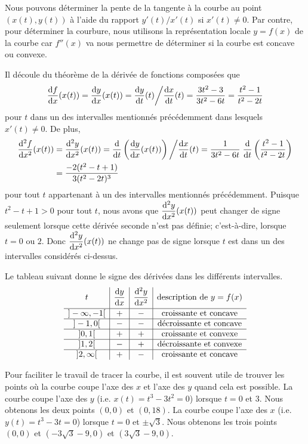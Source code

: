 {\begin{egg}[\theory]
Nous pouvons déterminer la pente de la tangente à la courbe au point
$(x(t),y(t))$ à l'aide du rapport $y'(t)/x'(t)$ si $x'(t) \neq 0$.
Par contre, pour déterminer la courbure, nous utilisons la
représentation locale $y=f(x)$ de la courbe car $f''(x)$ va nous
permettre de déterminer si la courbe est concave ou convexe.

Il découle du théorème de la dérivée de fonctions composées que
\[
\dydx{f}{x}(x(t)) = \dydx{y}{x}(x(t)) = \dydx{y}{t}(t) \bigg/ \dydx{x}{t}(t)
= \frac{3t^2-3}{3t^2-6t} = \frac{t^2-1}{t^2-2t}
\]
pour $t$ dans un des intervalles mentionnés précédemment dans lesquels
$x'(t)\neq 0$.  De plus,
\begin{align*}
\dydxn{f}{x}{2}(x(t)) &= \dydxn{y}{x}{2}(x(t)) =
\dfdx{\left( \dydx{y}{x}(x(t)) \right)}{t}\bigg/\dydx{x}{t}(t)
= \frac{1}{3t^2-6t}\;
\dfdx{\left( \frac{t^2-1}{t^2-2t} \right)}{t} \\
&= \frac{-2(t^2-t+1)}{3(t^2-2t)^3}
\end{align*}
pour tout $t$ appartenant à un des intervalles mentionnés
précédemment.  Puisque $t^2-t+1 >0$ pour tout $t$, nous avons que
$\DS \dydxn{y}{x}{2}(x(t))$ peut changer de signe seulement
lorsque cette dérivée seconde n'est pas définie; c'est-à-dire, lorsque
$t=0$ ou $2$.  Donc $\DS \dydxn{y}{x}{2}(x(t))$ ne change
pas de signe lorsque $t$ est dans un des intervalles considérés ci-dessus.

Le tableau suivant donne le signe des dérivées dans les
différents intervalles.
\[
\begin{array}{c|c|c|c}
t & \DS \dydx{y}{x} & \DS \dydxn{y}{x}{2} &
\text{description de } y=f(x) \\[0.7em]
\hline
]-\infty,-1[ & + & - & \text{croissante et concave} \\
\hline
]-1,0[ & - & - & \text{décroissante et concave} \\
\hline
]0,1[ & + & + & \text{croissante et convexe} \\
\hline
]1,2[ & - & + & \text{décroissante et convexe} \\
\hline
]2,\infty[ & + & - & \text{croissante et concave}
\end{array}
\]

Pour faciliter le travail de tracer la courbe, il est souvent utile de
trouver les points où la courbe coupe l'axe des $x$ et l'axe des $y$
quand cela est possible.  La courbe coupe l'axe des $y$
(i.e. $x(t)=t^3-3t^2=0$) lorsque $t=0$ et $3$.  Nous obtenons les deux
points $(0,0)$ et $(0,18)$.  La courbe coupe l'axe des $x$
(i.e. $y(t)=t^3-3t=0$) lorsque $t=0$ et $\pm \sqrt{3}$.  Nous obtenons
les trois points $(0,0)$ et $(-3\sqrt{3}-9,0)$ et $(3\sqrt{3} -9,0)$.


\end{egg}}
